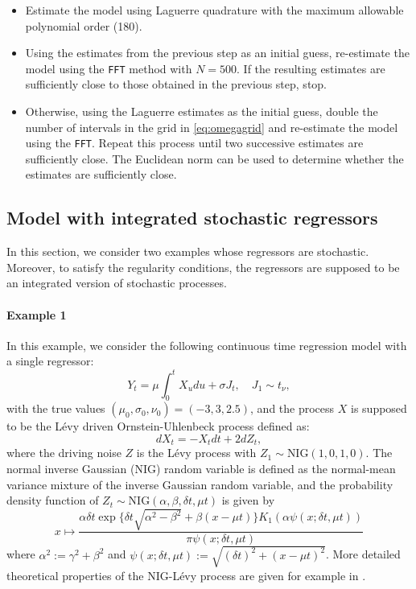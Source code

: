 \begin{itemize}
\tightlist
\item
  Estimate the model using Laguerre quadrature with the maximum allowable polynomial order (180).
\item
  Using the estimates from the previous step as an initial guess, re-estimate the model using the \texttt{FFT} method with \(N=500\). If the resulting estimates are sufficiently close to those obtained in the previous step, stop.
\item
  Otherwise, using the Laguerre estimates as the initial guess, double the number of intervals in the grid in \eqref{eq:omegagrid} and re-estimate the model using the \texttt{FFT}. Repeat this process until two successive estimates are sufficiently close. The Euclidean norm can be used to determine whether the estimates are sufficiently close.
\end{itemize}

\subsection{Model with integrated stochastic regressors}\label{aa}

In this section, we consider two examples whose regressors are stochastic.
Moreover, to satisfy the regularity conditions, the regressors are supposed to be an integrated version of stochastic processes.

\paragraph{Example 1}\label{example-1}

In this example, we consider the following continuous time regression model with a single regressor:
\begin{equation}
 Y_t=\mu \int_0^t X_{u}du+\sigma J_t, \quad J_1\sim t_\nu,
\label{eq:yuex1}
\end{equation}
with the true values \((\mu_0,\sigma_0,\nu_0)=(-3,3,2.5)\), and the process \(X\) is supposed to be the Lévy driven Ornstein-Uhlenbeck process defined as:
\begin{equation}
\nonumber dX_t= -X_tdt+ 2dZ_t,
\end{equation}
where the driving noise \(Z\) is the Lévy process with \(Z_1\sim\text{NIG}(1,0,1,0)\).
The normal inverse Gaussian (NIG) random variable is defined as the normal-mean variance mixture of the inverse Gaussian random variable, and the probability density function of \(Z_t\sim \text{NIG}(\alpha,\beta,\delta t,\mu t)\) is given by
\begin{equation*}
x\mapsto
\frac{\alpha\delta t\exp\{\delta t\sqrt{\alpha^{2}-\beta^{2}}+\beta(x-\mu t)\} K_{1}(\alpha \psi(x;\delta t,\mu t))}{\pi \psi(x;\delta t,\mu t)}
\end{equation*}
where \(\alpha^2:=\gamma^2+\beta^2\) and \(\psi(x;\delta t,\mu t):=\sqrt{(\delta t)^{2}+(x-\mu t)^{2}}\).
More detailed theoretical properties of the NIG-Lévy process are given for example in \cite{@Bar98}.


